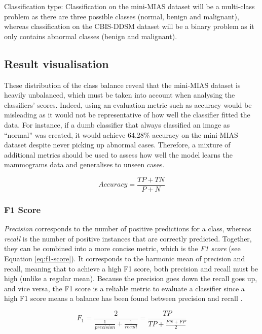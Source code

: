 Classification type: Classification on the mini-MIAS dataset will be a multi-class problem as there are three possible classes (normal, benign and malignant), whereas classification on the CBIS-DDSM dataset will be a binary problem as it only contains abnormal classes (benign and malignant).


\subsection{Result visualisation}
\label{sec:design-results-visualisation}

These distribution of the class balance reveal that the mini-MIAS dataset is heavily unbalanced, which must be taken into account when analysing the classifiers' scores. Indeed, using an  evaluation metric such as accuracy would be misleading as it would not be representative of how well the classifier fitted the data. For instance, if a dumb classifier that always classified an image as ``normal'' was created, it would achieve 64.28\% accuracy on the mini-MIAS dataset despite  never picking up abnormal cases. Therefore, a mixture of additional metrics should be used to assess how well the model learns the mammograms data and generalises to unseen cases.

\begin{equation}
\label{eq:accuracy}
    Accuracy = \frac{TP + TN}{P +N}
\end{equation}

\subsubsection{F1 Score}

\textit{Precision} corresponds to the number of positive predictions for a class, whereas \textit{recall} is the number of positive instances  that are correctly predicted. Together, they can be combined into a more concise metric, which is the \textit{F1 score} (see Equation \ref{eq:f1-score}). It corresponds to the harmonic mean of precision and recall, meaning that to achieve a high F1 score, both precision and recall must be high (unlike a regular mean). Because the precision goes down the recall goes up, and vice versa, the F1 score is a reliable metric to evaluate a classifier since a high F1 score means a balance has been found between precision and recall \citep{Geron2019}.

\begin{equation}
\label{eq:f1-score}
    F_{1} = \frac{2}{\frac{1}{precision} + \frac{1}{recall}} = \frac{TP}{TP+\frac{FN + FP}{2}}
\end{equation}

